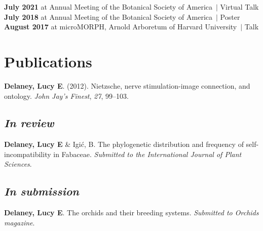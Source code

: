 \documentclass[]{article}
\newlength{\cslhangindent}
\newenvironment{cslreferences}
{\setlength{\parindent}{0pt}
\everypar{\setlength{\hangindent}{\cslhangindent}}\ignorespaces}
{\par}
\begin{document}
\textbf{July 2021} at Annual Meeting of the Botanical Society of America\ $\vert$ Virtual Talk \hspace{0.3mm} \href{https://uofi.box.com/v/2021botany-talk}{\faVideo} \href{https://ledelaney.org/talks/2021botany}{\faImages} \href{https://github.com/ledelaney/07-21-Botany}{\faGithub}\\
\textbf{July 2018} at Annual Meeting of the Botanical Society of America\ $\vert$ Poster \hspace{0.4mm} \href{https://ledelaney.org/static/posters/poster.png}{\faFileImage}\\
\textbf{August 2017} at microMORPH, Arnold Arboretum of Harvard University\ $\vert$ Talk \hspace{0.4mm} \href{https://www.dropbox.com/s/o7hcg5riw97wf9i/08-2017-microMORPH.pdf?dl=1}{\faImages}



\section{\fontsize{16}{48}\selectfont Publications}

\begin{cslreferences}
\textbf{Delaney, Lucy E}. (2012). Nietzsche, nerve stimulation-image connection, and ontology. \emph{John Jay's Finest}, \emph{27}, 99--103. \href{https://ledelaney.org/static/docs/Delaney-JJAYFinest.pdf}{\faFile}\\
\end{cslreferences}

\vspace{-10mm}

\subsection{\fontsize{12}{36}\selectfont \textit{In review}}
\vspace{-2mm}
\begin{cslreferences}
\textbf{Delaney, Lucy E} \& Igić, B. The phylogenetic distribution and frequency of self-incompatibility in Fabaceae. \textit{Submitted to the International Journal of Plant Sciences}.
\end{cslreferences}
\vspace{-4mm}

\subsection{\fontsize{12}{36}\selectfont \textit{In submission}}
\vspace{-2mm}
\begin{cslreferences}

\textbf{Delaney, Lucy E}. The orchids and their breeding systems. \textit{Submitted to Orchids magazine}.
\end{cslreferences}
\end{document}
